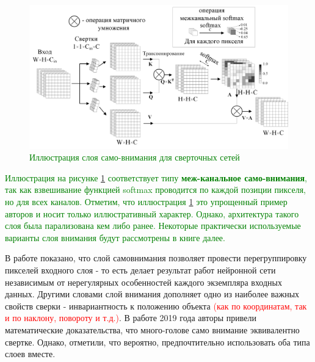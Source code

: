 \documentclass[12pt]{article}
\begin{document}
\begin{sloppypar}
\begin{figure}[!h]
	\begin{center}
		\includegraphics[width=0.99\linewidth]{./figuresch1/conv_self_att.png}
		\caption{
		\textcolor{green}
		{Иллюстрация слоя само-внимания для сверточных сетей}}	
		\label{ch1:fig:conv_self_attention}
	\end{center}
\end{figure}
\textcolor{green}{
Иллюстрация на рисунке \ref{ch1:fig:conv_self_attention} соответствует типу \textbf{меж-канальное само-внимания}, так как взвешивание функцией softmax проводится по каждой позиции пикселя, но для всех каналов.}
\textcolor{green}{
Отметим, что иллюстрация \ref{ch1:fig:conv_self_attention} это упрощенный пример авторов и носит только иллюстративный характер. Однако, архитектура такого слоя была парализована кем либо ранее. Некоторые практически используемые варианты слоя внимания будут рассмотрены в книге далее.}

В работе \cite{cordonnier2019relationship} показано, что
слой самовнимания позволяет провести перегруппировку пикселей входного слоя - то есть делает результат работ нейронной сети независимым от нерегулярных особенностей каждого экземпляра входных данных. Другими словами слой внимания дополняет одно из наиболее важных свойств сверки - инвариантность к положению объекта \textcolor{red}{(как по координатам, так и по наклону, повороту и т.д.)}. В работе \cite{cordonnier2019relationship} 2019 года авторы привели математические доказательства, что много-голове само внимание эквивалентно свертке. Однако, отметили, что вероятно, предпочтительно использовать оба типа слоев вместе. 





\end{sloppypar}
\end{document}
